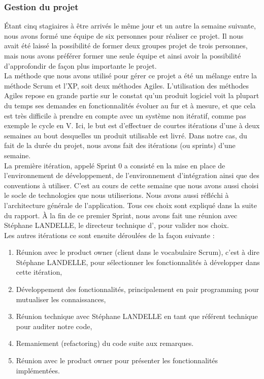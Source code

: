 \subsubsection{Gestion du projet}

Étant cinq stagiaires à être arrivés le même jour et un autre la semaine suivante, nous avons formé une équipe de six personnes pour réaliser ce projet. Il nous avait été laissé la possibilité de former deux groupes projet de trois personnes, mais nous avons préférer former une seule équipe et ainsi avoir la possibilité d'approfondir de façon plus importante le projet.\\

La méthode que nous avons utilisé pour gérer ce projet a été un mélange entre la méthode Scrum et l'XP, soit deux méthodes Agiles. L'utilisation des méthodes Agiles repose en grande partie sur le constat qu'un produit logiciel voit la plupart du temps ses demandes en fonctionnalités évoluer au fur et à mesure, et que cela est très difficile à prendre en compte avec un  système non itératif, comme pas exemple le cycle en V. Ici, le but est d'effectuer de courtes itérations d'une à deux semaines au bout desquelles un produit utilisable est livré. Dans notre cas, du fait de la durée du projet, nous avons fait des itérations (ou sprints) d'une semaine.\\

La première itération, appelé Sprint 0 a consisté en la mise en place de l'environnement de développement, de l'environnement d'intégration ainsi que des conventions à utiliser. C'est au cours de cette semaine que nous avons aussi choisi le socle de technologies que nous utiliserions. Nous avons aussi réfléchi à l'architecture générale de l'application. Tous ces choix sont expliqué dans la suite du rapport. À la fin de ce premier Sprint, nous avons fait une réunion avec Stéphane LANDELLE, le directeur technique d'\ebi{}, pour valider nos choix.\\

Les autres itérations ce sont ensuite déroulées de la façon suivante :
\begin{enumerate}
	\item Réunion avec le \flqq{}product owner\frqq{} (client dans le vocabulaire Scrum), c'est à dire Stéphane LANDELLE, pour sélectionner les fonctionnalités à développer dans cette itération,
	
	\item Développement des fonctionnalités, principalement en pair programming pour mutualiser les connaissances,
	
	\item Réunion technique avec Stéphane LANDELLE en tant que référent technique pour auditer notre code,
	
	\item Remaniement (refactoring) du code suite aux remarques.
	
	\item Réunion avec le \flqq{}product owner\frqq{} pour présenter les fonctionnalités implémentées.\\
\end{enumerate}

